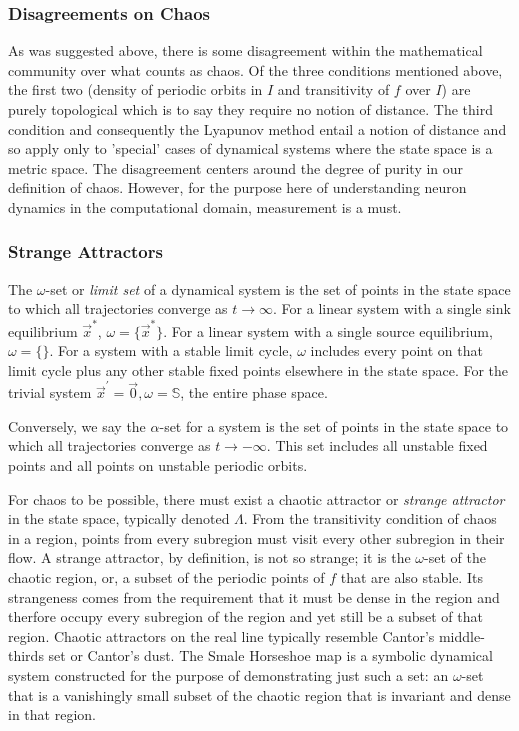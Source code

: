 \documentclass{elsart1p}
\begin{document}
\subsubsection{Disagreements on Chaos}
As was suggested above, there is some disagreement within the 
mathematical community over what counts as chaos.  Of the three conditions
mentioned above, the first two (density of periodic orbits in $I$ and
transitivity of $f$ over $I$) are purely topological which is to say they
require no notion of
distance.  The third condition and consequently the Lyapunov method 
entail a notion of distance 
and so apply only to 'special' cases of dynamical systems where the 
state space is a metric space.
The disagreement
centers around the degree of purity in our definition of chaos.  However,
for the purpose here of understanding neuron dynamics in the computational
domain, measurement is a must.  

\subsubsection{Strange Attractors}

The $\omega$-set or \textit{limit set} of a dynamical system is the set 
of points in the state
space to which all trajectories converge as $t \rightarrow \infty$.  For a 
linear system with a single sink equilibrium $\vec{x}^{*}$, 
$\omega=\{\vec{x}^{*}\}$.  For a linear system with a single source equilibrium,
$\omega=\{\}$.  For a system with a stable limit cycle, $\omega$ includes
every point on that limit cycle plus any other stable fixed points elsewhere
in the state space.  For the trivial system $\vec{x}^{\prime}=\vec{0}, \omega=\mathbb{S}$, the entire phase space.

Conversely, we say the $\alpha$-set for a system is the set of points
in the state space to which all trajectories converge as 
$t \rightarrow -\infty$.  This set includes all unstable fixed points and
all points on unstable periodic orbits.

For chaos to be possible, there must exist a chaotic attractor or 
\textit{strange attractor} in
the state space, typically denoted $\Lambda$.  
From the transitivity condition of chaos in a region, 
points from every subregion must visit every other subregion in their
flow.  A strange attractor, by definition, is not so strange; it is the
$\omega$-set of the chaotic region, or, a subset of the periodic points of $f$
that are also stable.  Its strangeness comes from the requirement that it
must be dense in the region and therfore occupy every subregion of the region
and yet still be a subset of that region.  
Chaotic attractors on the real line typically resemble Cantor's middle-thirds
set or Cantor's dust.
The Smale Horseshoe map is
a symbolic dynamical system constructed for the purpose of demonstrating 
just such a set:  an $\omega$-set that is a vanishingly small subset of 
the chaotic region that is invariant and dense in that region.
\end{document}
